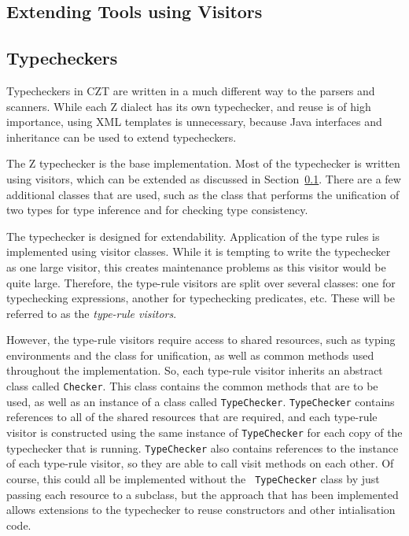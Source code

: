 \documentclass{llncs}
\begin{document}
\subsection{Extending Tools using Visitors}
\label{extending-visitors}

\subsection{Typecheckers}

Typecheckers in CZT are written in a much different way to the parsers
and scanners. While each Z dialect has its own typechecker, and reuse
is of high importance, using XML templates is unnecessary, because
Java interfaces and inheritance can be used to extend typecheckers.

The Z typechecker is the base implementation. Most of the typechecker
is written using visitors, which can be extended as discussed in
Section~\ref{extending-visitors}. There are a few additional classes
that are used, such as the class that performs the unification of two
types for type inference and for checking type consistency.

The typechecker is designed for extendability. Application of the type
rules is implemented using visitor classes. While it is tempting to
write the typechecker as one large visitor, this creates maintenance
problems as this visitor would be quite large. Therefore, the
type-rule visitors are split over several classes: one for
typechecking expressions, another for typechecking predicates,
etc. These will be referred to as the {\em type-rule visitors}.

However, the type-rule visitors require access to shared resources,
such as typing environments and the class for unification, as well as
common methods used throughout the implementation. So, each type-rule
visitor inherits an abstract class called {\tt Checker}. This class
contains the common methods that are to be used, as well as an
instance of a class called {\tt TypeChecker}. {\tt TypeChecker}
contains references to all of the shared resources that are required,
and each type-rule visitor is constructed using the same instance of
{\tt TypeChecker} for each copy of the typechecker that is
running. {\tt TypeChecker} also contains references to the instance of
each type-rule visitor, so they are able to call visit methods on each
other. Of course, this could all be implemented without the {\tt
TypeChecker} class by just passing each resource to a subclass, but
the approach that has been implemented allows extensions to the
typechecker to reuse constructors and other intialisation code.
\end{document}
